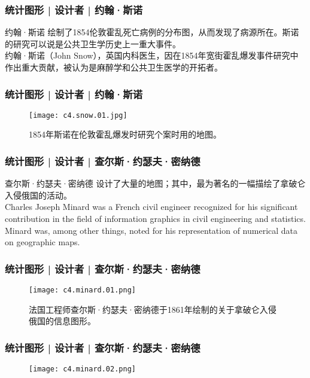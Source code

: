 \begin{frame}
  \frametitle{统计图形 | 设计者 | 约翰·斯诺}
  \begin{block}{约翰·斯诺}
    绘制了1854伦敦霍乱死亡病例的分布图，从而发现了病源所在。斯诺的研究可以说是公共卫生学历史上一重大事件。\\
    \vspace{0.5em}
    约翰·斯诺（John Snow），英国内科医生，因在1854年宽街霍乱爆发事件研究中作出重大贡献，被认为是麻醉学和公共卫生医学的开拓者。\\
  \end{block}
\end{frame}

\begin{frame}
  \frametitle{统计图形 | 设计者 | 约翰·斯诺}
  \begin{figure}
    \centering
    \texttt{[image: c4.snow.01.jpg]}
    \caption{1854年斯诺在伦敦霍乱爆发时研究个案时用的地图。}
  \end{figure}
\end{frame}

\begin{frame}
  \frametitle{统计图形 | 设计者 | 查尔斯·约瑟夫·密纳德}
  \begin{block}{查尔斯·约瑟夫·密纳德}
  设计了大量的地图；其中，最为著名的一幅描绘了拿破仑入侵俄国的活动。\\
  \vspace{0.5em}
  Charles Joseph Minard was a French civil engineer recognized for his significant contribution in the field of information graphics in civil engineering and statistics. Minard was, among other things, noted for his representation of numerical data on geographic maps.
  \end{block}
\end{frame}

\begin{frame}
  \frametitle{统计图形 | 设计者 | 查尔斯·约瑟夫·密纳德}
  \begin{figure}
    \centering
    \texttt{[image: c4.minard.01.png]}
    \caption{法国工程师查尔斯·约瑟夫·密纳德于1861年绘制的关于拿破仑入侵俄国的信息图形。}
  \end{figure}
\end{frame}

\begin{frame}
  \frametitle{统计图形 | 设计者 | 查尔斯·约瑟夫·密纳德}
  \begin{figure}
    \centering
    \texttt{[image: c4.minard.02.png]}
  \end{figure}
\end{frame}

